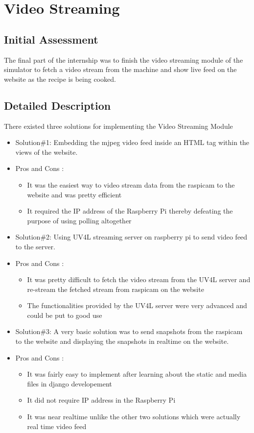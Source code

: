 \section{Video Streaming}
\subsection{Initial Assessment}
{\normalsize The final part of the internship was to finish the video streaming module of the simulator to fetch a video stream from the machine and show live feed on the website as the recipe is being cooked. 
}
\subsection{Detailed Description}
{\normalsize There existed three solutions for implementing the Video Streaming Module 
\begin{itemize}
    \item Solution\#1: Embedding the mjpeg video feed inside an HTML tag within the views of the website.
    \item Pros and Cons : 
    \begin{itemize}
    \renewcommand{\labelitemi}{$\Rightarrow$}
    \item It was the easiest way to video stream data from the raspicam to the website and was pretty efficient 
    \item It required the IP address of the Raspberry Pi thereby defeating the purpose of using polling altogether
    \end{itemize}
    
    \item Solution\#2: Using UV4L streaming server on raspberry pi to send video feed to the server.
    \item Pros and Cons : 
    \begin{itemize}
    \renewcommand{\labelitemi}{$\Rightarrow$}
    \item It was pretty difficult to fetch the video stream from the UV4L server and re-stream the fetched stream from raspicam on the website
    \item The functionalities provided by the UV4L server were very advanced and could be put to good use
    \end{itemize}
    
    \item Solution\#3: A very basic solution was to send snapshots from the raspicam to the website and displaying the snapshots in realtime on the website.
    \item Pros and Cons : 
    \begin{itemize}
    \renewcommand{\labelitemi}{$\Rightarrow$}
    \item It was fairly easy to implement after learning about the static and media files in django developement
    \item It did not require IP address in the Raspberry Pi
    \item It was near realtime unlike the other two solutions which were actually real time video feed
    \end{itemize}
    
\end{itemize}
}
